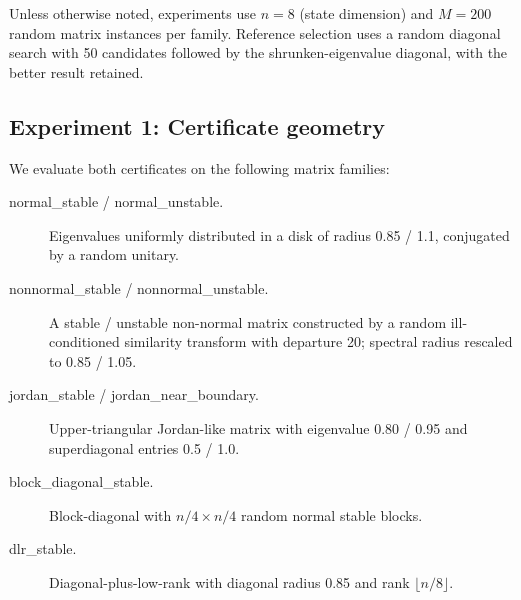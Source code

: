 \documentclass{article}
\theoremstyle{definition}
\begin{document}
Unless otherwise noted, experiments use $n = 8$ (state dimension) and $M = 200$
random matrix instances per family.  Reference selection uses a random diagonal
search with 50 candidates followed by the shrunken-eigenvalue diagonal, with the
better result retained.

\subsection{Experiment 1: Certificate geometry}

We evaluate both certificates on the following matrix families:

\begin{description}
  \item[normal\_stable / normal\_unstable.] Eigenvalues uniformly distributed
    in a disk of radius 0.85 / 1.1, conjugated by a random unitary.
  \item[nonnormal\_stable / nonnormal\_unstable.] A stable / unstable
    non-normal matrix constructed by a random ill-conditioned similarity
    transform with departure 20; spectral radius rescaled to 0.85 / 1.05.
  \item[jordan\_stable / jordan\_near\_boundary.] Upper-triangular Jordan-like
    matrix with eigenvalue 0.80 / 0.95 and superdiagonal entries 0.5 / 1.0.
  \item[block\_diagonal\_stable.] Block-diagonal with $n/4 \times n/4$ random
    normal stable blocks.
  \item[dlr\_stable.] Diagonal-plus-low-rank with diagonal radius 0.85 and
    rank $\lfloor n/8 \rfloor$.
\end{description}
\end{document}
